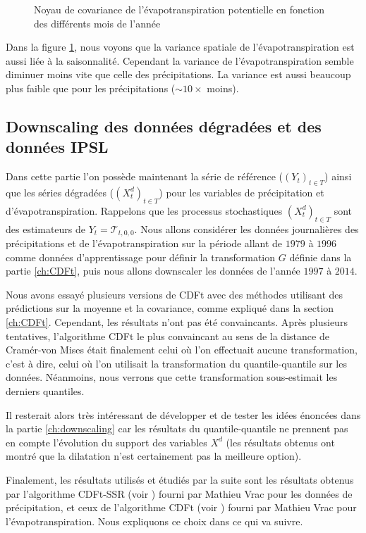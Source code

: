 \documentclass[a4paper,11pt]{article}
\numberwithin{equation}{section}
\begin{document}
\begin{figure}[H]
\begin{tabular}{ccc}
\end{tabular} 
	\caption{Noyau de covariance de l'évapotranspiration potentielle en fonction des différents mois de l'année}
	\label{fig-kernel-evap}
\end{figure}

Dans la figure \ref{fig-kernel-evap}, nous voyons que la variance spatiale de l'évapotranspiration est aussi liée à la saisonnalité. Cependant la variance de l'évapotranspiration semble diminuer moins vite que celle des précipitations. La variance est aussi beaucoup plus faible que pour les précipitations ($\sim 10 \times$ moins). 

\subsection{Downscaling des données dégradées et des données IPSL}
\label{ch:downscaling des donnees}

Dans cette partie l'on possède maintenant la série de référence ($(Y_t)_{t \in T}$) ainsi que les séries dégradées ($(X^d_t)_{t\in T}$) pour les variables de précipitation et d'évapotranspiration. Rappelons que les processus stochastiques $(X^d_t)_{t\in T}$ sont des estimateurs de $Y_t=\mathcal{T}_{t,0,0}$. Nous allons considérer les données journalières des précipitations et de l'évapotranspiration sur la période allant de $1979$ à $1996$ comme données d'apprentissage pour définir la transformation $G$ définie dans la partie \ref{ch:CDFt}, puis nous allons downscaler les données de l'année $1997$ à $2014$.

Nous avons essayé plusieurs versions de CDFt avec des méthodes utilisant des prédictions sur la moyenne et la covariance, comme expliqué dans la section \ref{ch:CDFt}. Cependant, les résultats n'ont pas été convaincants. Après plusieurs tentatives, l'algorithme CDFt le plus convaincant au sens de la distance de Cramér-von Mises était finalement celui où l'on effectuait aucune transformation, c'est à dire, celui où l'on utilisait la transformation du quantile-quantile sur les données. Néanmoins, nous verrons que cette transformation sous-estimait les derniers quantiles.

Il resterait alors très intéressant de développer et de tester les idées énoncées dans la partie \ref{ch:downscaling} car les résultats du quantile-quantile ne prennent pas en compte l'évolution du support des variables $X^d$ (les résultats obtenus ont montré que la dilatation n'est certainement pas la meilleure option).

Finalement, les résultats utilisés et étudiés par la suite sont les résultats obtenus par l'algorithme CDFt-SSR (voir \cite{vrac2016bias}) fourni par Mathieu Vrac pour les données de précipitation, et ceux de l'algorithme CDFt (voir \cite{vrac2012dynamical}) fourni par Mathieu Vrac pour l'évapotranspiration. Nous expliquons ce choix dans ce qui va suivre.
\end{document}
